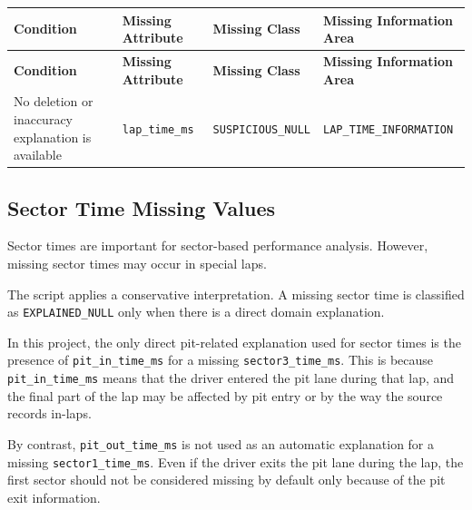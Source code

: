 \documentclass[a4paper,11pt]{article}
\begin{document}
	
	\begin{longtable}{p{4.5cm}p{4cm}p{3.5cm}p{4cm}}
		\toprule
		\textbf{Condition} & \textbf{Missing Attribute} & \textbf{Missing Class} & \textbf{Missing Information Area} \\
		\midrule
		\endfirsthead
		
		\toprule
		\textbf{Condition} & \textbf{Missing Attribute} & \textbf{Missing Class} & \textbf{Missing Information Area} \\
		\midrule
		\endhead
		
		
		No deletion or inaccuracy explanation is available
		& \texttt{lap\_time\_ms}
		& \texttt{SUSPICIOUS\_NULL}
		& \texttt{LAP\_TIME\_INFORMATION} \\
		\bottomrule
	\end{longtable}
	

	\subsection{Sector Time Missing Values}
	
	Sector times are important for sector-based performance analysis.
	However, missing sector times may occur in special laps.
	
	The script applies a conservative interpretation.
	A missing sector time is classified as \texttt{EXPLAINED\_NULL} only when there is a direct domain explanation.
	
	In this project, the only direct pit-related explanation used for sector times is the presence of \texttt{pit\_in\_time\_ms} for a missing \texttt{sector3\_time\_ms}.
	This is because \texttt{pit\_in\_time\_ms} means that the driver entered the pit lane during that lap, and the final part of the lap may be affected by pit entry or by the way the source records in-laps.
	
	By contrast, \texttt{pit\_out\_time\_ms} is not used as an automatic explanation for a missing \texttt{sector1\_time\_ms}.
	Even if the driver exits the pit lane during the lap, the first sector should not be considered missing by default only because of the pit exit information.
	
\end{document}
